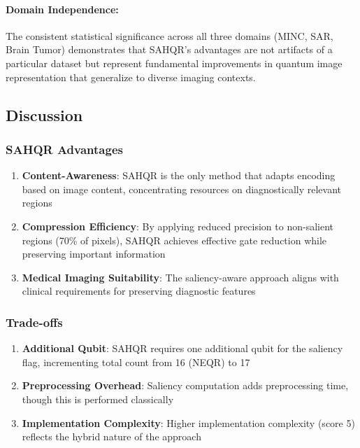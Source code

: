 \documentclass[pdflatex,sn-mathphys-num,Numbered]{sn-jnl}
\theoremstyle{thmstyleone}
\theoremstyle{thmstyletwo}
\theoremstyle{thmstylethree}
\begin{document}
\paragraph{Domain Independence:} The consistent statistical significance across all three domains (MINC, SAR, Brain Tumor) demonstrates that SAHQR's advantages are not artifacts of a particular dataset but represent fundamental improvements in quantum image representation that generalize to diverse imaging contexts.

\subsection{Discussion}

\subsubsection{SAHQR Advantages}

\begin{enumerate}
\item \textbf{Content-Awareness}: SAHQR is the only method that adapts encoding based on image content, concentrating resources on diagnostically relevant regions
\item \textbf{Compression Efficiency}: By applying reduced precision to non-salient regions (70\% of pixels), SAHQR achieves effective gate reduction while preserving important information
\item \textbf{Medical Imaging Suitability}: The saliency-aware approach aligns with clinical requirements for preserving diagnostic features
\end{enumerate}

\subsubsection{Trade-offs}

\begin{enumerate}
\item \textbf{Additional Qubit}: SAHQR requires one additional qubit for the saliency flag, incrementing total count from 16 (NEQR) to 17
\item \textbf{Preprocessing Overhead}: Saliency computation adds preprocessing time, though this is performed classically
\item \textbf{Implementation Complexity}: Higher implementation complexity (score 5) reflects the hybrid nature of the approach
\end{enumerate}
\end{document}
